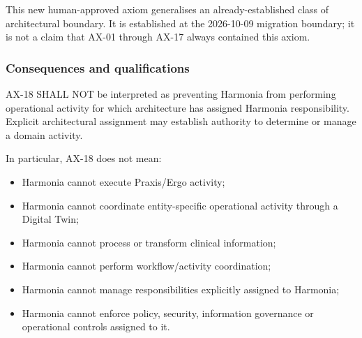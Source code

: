 \label{rad:axioms:893}

This new human-approved axiom generalises an already-established class of architectural boundary. It is established at the 2026-10-09 migration boundary; it is not a claim that AX-01 through AX-17 always contained this axiom.

\label{rad:axioms:898}
\subsubsection*{Consequences and qualifications}
\label{rad:axioms:900}

AX-18 SHALL NOT be interpreted as preventing Harmonia from performing operational activity for which architecture has assigned Harmonia responsibility. Explicit architectural assignment may establish authority to determine or manage a domain activity.

\label{rad:axioms:905}

In particular, AX-18 does not mean:

\label{rad:axioms:907}

\begin{itemize}

\item 
Harmonia cannot execute Praxis/\allowbreak{}Ergo activity;



\item 
Harmonia cannot coordinate entity-specific operational activity through a Digital Twin;



\item 
Harmonia cannot process or transform clinical information;



\item 
Harmonia cannot perform workflow/\allowbreak{}activity coordination;



\item 
Harmonia cannot manage responsibilities explicitly assigned to Harmonia;



\item 
Harmonia cannot enforce policy, security, information governance or operational controls assigned to it.



\end{itemize}
\label{rad:axioms:914}

